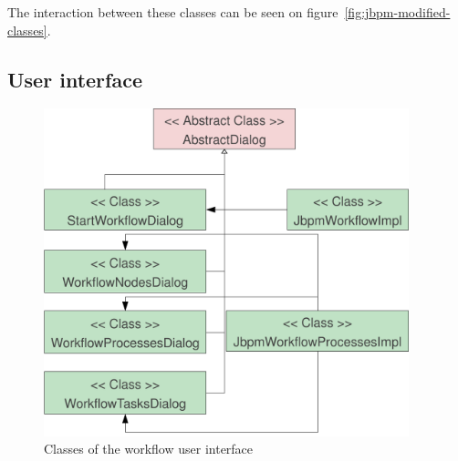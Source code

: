 The interaction between these classes can be seen on figure~\ref{fig:jbpm-modified-classes}.

\subsection{User interface}

\begin{figure}[p]
\centering
\includegraphics[width=400px,keepaspectratio]{design-wfui.pdf}
\caption{Classes of the workflow user interface}
\label{fig:design-wfui}
\end{figure}
